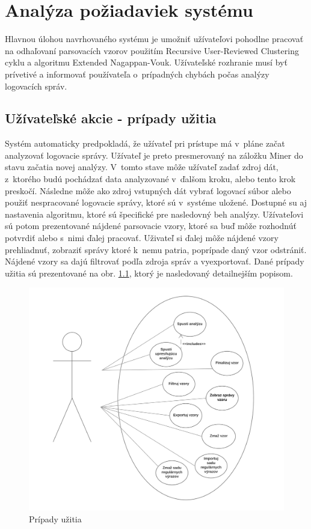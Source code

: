 \chapter{Analýza požiadaviek systému}

Hlavnou úlohou navrhovaného systému je umožniť užívateľovi pohodlne pracovať na odhaľovaní parsovacích vzorov použitím Recursive User-Reviewed Clustering cyklu a algoritmu Extended Nagappan-Vouk. Užívateľské rozhranie musí byť prívetivé a informovať používateľa o~prípadných chybách počas analýzy logovacích správ.

\section{Užívateľské akcie - prípady užitia}

Systém automaticky predpokladá, že užívateľ pri prístupe má v~pláne začat analyzovať logovacie správy. Užívateľ je preto presmerovaný na záložku Miner do stavu začatia novej analýzy. V~tomto stave môže užívateľ zadať zdroj dát, z~ktorého budú pochádzať data analyzované v~ďalšom kroku, alebo tento krok preskočí. Následne môže ako zdroj vstupných dát vybrať logovací súbor alebo použiť nespracované logovacie správy, ktoré sú v~systéme uložené. Dostupné su aj nastavenia algoritmu, ktoré sú špecifické pre nasledovný beh analýzy. Užívateľovi sú potom prezentované nájdené parsovacie vzory, ktoré sa buď môže rozhodnúť potvrdiť alebo s~nimi ďalej pracovať. Uživateľ si ďalej môže nájdené vzory prehliadnuť, zobraziť správy ktoré k~nemu patria, poprípade daný vzor odstrániť. Nájdené vzory sa dajú filtrovať podľa zdroja správ a vyexportovať. Dané prípady užitia sú prezentované na obr. \ref{fig:use-cases}, ktorý je nasledovaný detailnejším popisom.

\clearpage

\begin{figure}[htbp]
 \centering 
 \begin{minipage}{0.9\linewidth}
 	\centering
 	\includegraphics[width=\textwidth]{images/thesis-use-cases.png}	
 \end{minipage}
  \caption{Prípady užitia}
  \label{fig:use-cases}
\end{figure}

